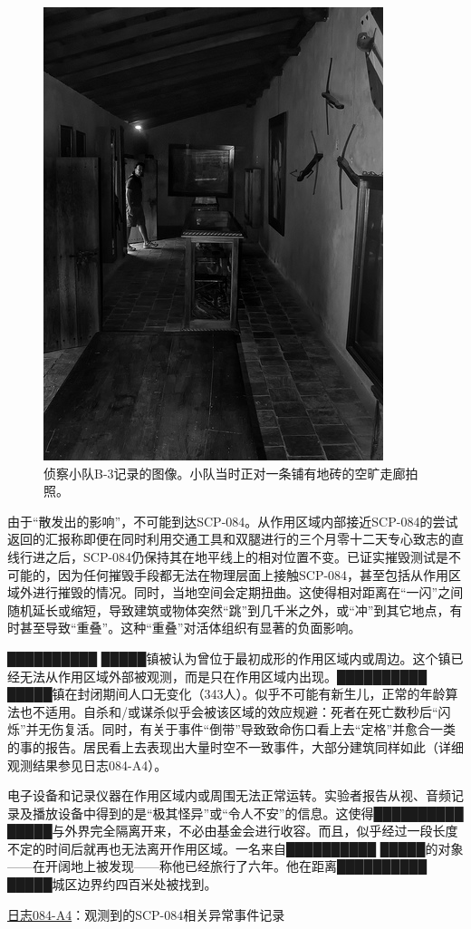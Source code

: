 \begin{figure}[H]
    \centering
    \includegraphics[width=0.5\linewidth]{images/SCP.084.2.jpg}
    \caption*{侦察小队B-3记录的图像。小队当时正对一条铺有地砖的空旷走廊拍照。}
\end{figure}

由于“散发出的影响”，不可能到达SCP-084。从作用区域内部接近SCP-084的尝试返回的汇报称即便在同时利用交通工具和双腿进行的三个月零十二天专心致志的直线行进之后，SCP-084仍保持其在地平线上的相对位置不变。已证实摧毁测试是不可能的，因为任何摧毁手段都无法在物理层面上接触SCP-084，甚至包括从作用区域外进行摧毁的情况。同时，当地空间会定期扭曲。这使得相对距离在“一闪”之间随机延长或缩短，导致建筑或物体突然“跳”到几千米之外，或“冲”到其它地点，有时甚至导致“重叠”。这种“重叠”对活体组织有显著的负面影响。

██████████ █████镇被认为曾位于最初成形的作用区域内或周边。这个镇已经无法从作用区域外部被观测，而是只在作用区域内出现。██████████ █████镇在封闭期间人口无变化（343人）。似乎不可能有新生儿，正常的年龄算法也不适用。自杀和\slash 或谋杀似乎会被该区域的效应规避：死者在死亡数秒后“闪烁”并无伤复活。同时，有关于事件“倒带”导致致命伤口看上去“定格”并愈合一类的事的报告。居民看上去表现出大量时空不一致事件，大部分建筑同样如此（详细观测结果参见日志084-A4）。

电子设备和记录仪器在作用区域内或周围无法正常运转。实验者报告从视、音频记录及播放设备中得到的是“极其怪异”或“令人不安”的信息。这使得██████████ █████与外界完全隔离开来，不必由基金会进行收容。而且，似乎经过一段长度不定的时间后就再也无法离开作用区域。一名来自██████████ █████的对象——在开阔地上被发现——称他已经旅行了六年。他在距离██████████ █████城区边界约四百米处被找到。

\hr

\hyperref[chap:DOC-log-084-a4]{日志084-A4}：观测到的SCP-084相关异常事件记录

\hr
